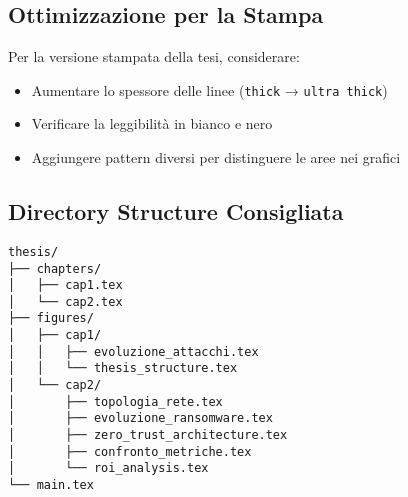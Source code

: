 \documentclass[11pt,a4paper]{article}
\begin{document}
\subsection*{Ottimizzazione per la Stampa}
Per la versione stampata della tesi, considerare:
\begin{itemize}
    \item Aumentare lo spessore delle linee (\texttt{thick} → \texttt{ultra thick})
    \item Verificare la leggibilità in bianco e nero
    \item Aggiungere pattern diversi per distinguere le aree nei grafici
\end{itemize}

\subsection*{Directory Structure Consigliata}
\begin{verbatim}
thesis/
├── chapters/
│   ├── cap1.tex
│   └── cap2.tex
├── figures/
│   ├── cap1/
│   │   ├── evoluzione_attacchi.tex
│   │   └── thesis_structure.tex
│   └── cap2/
│       ├── topologia_rete.tex
│       ├── evoluzione_ransomware.tex
│       ├── zero_trust_architecture.tex
│       ├── confronto_metriche.tex
│       └── roi_analysis.tex
└── main.tex
\end{verbatim}
\end{document}
